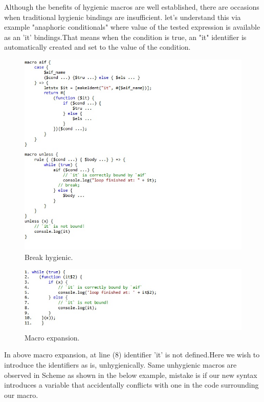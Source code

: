 Although the benefits of hygienic macros are well established, there are occasions when traditional hygienic bindings are insufficient. let's understand this via example "anaphoric conditionals" where value of the tested expression is available as an 'it' bindings.That means when the condition is true, an "it" identifier is automatically created and set to the value of the condition.
\begin{figure}
\centering
\includegraphics[width=1.0\textwidth]{images/Breakhygiene.jpg}
\caption{Break hygienic.} 
\label{fig:Breakhygiene}
\end{figure}

\begin{figure}
\centering
\includegraphics[width=1.0\textwidth]{images/macroexpansion.jpg}
\caption{Macro expansion.} 
\label{fig:macroexpansion}
\end{figure}

\newpage

In above macro expansion, at line (8) identifier 'it' is not defined.Here we wish to introduce the identifiers as is, unhygienically. Same unhygienic macros are observed in Scheme as shown in the below example, mistake is if our new syntax introduces a variable that accidentally conflicts with one in the code surrounding our macro.

